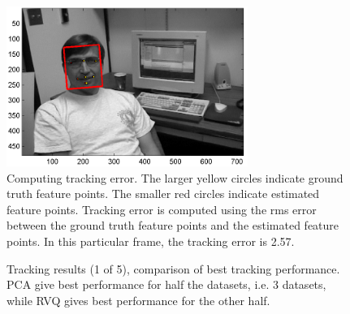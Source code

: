 								\begin{figure}[t]
								\centering
								\includegraphics[width=0.7\textwidth]{thesis/results_pca__trk_dudek_0007.png}
								\caption{Computing tracking error.  The larger yellow circles indicate ground truth feature points.  The smaller red circles indicate estimated feature points.  Tracking error is computed using the rms error between the ground truth feature points and the estimated feature points.  In this particular frame, the tracking error is 2.57.}
								\label{fig:results_pca__trk_dudek_0007}
								\end{figure}

								\begin{figure}[t]
								\centering
								
								\caption{Tracking results (1 of 5), comparison of best tracking performance.  PCA give best performance for half the datasets, i.e. 3 datasets, while RVQ gives best performance for the other half.}
								\label{fig:results_final_1_best}
								\end{figure}

